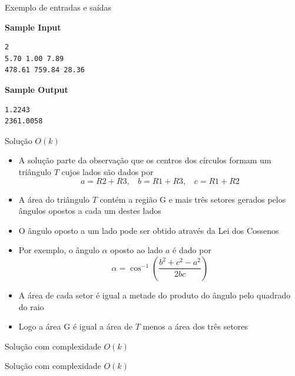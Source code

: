 \begin{frame}[fragile]{Exemplo de entradas e saídas}

\begin{minipage}[t]{0.5\textwidth}
\textbf{Sample Input}
\begin{verbatim}
2
5.70 1.00 7.89
478.61 759.84 28.36
\end{verbatim}
\end{minipage}
\begin{minipage}[t]{0.45\textwidth}
\textbf{Sample Output}
\begin{verbatim}
1.2243
2361.0058
\end{verbatim}
\end{minipage}
\end{frame}

\begin{frame}[fragile]{Solução $O(k)$}

    \begin{itemize}
        \item A solução parte da observação que os centros dos círculos formam um triângulo
            $T$ cujos lados são dados por
        \[
            a = R2 + R3,\ \ \ \ b = R1 + R3,\ \ \ \ c = R1 + R2
        \]

        \item A área do triângulo $T$ contém a região G e mais três setores gerados pelos
            ângulos opostos a cada um destes lados

        \item O ângulo oposto a um lado pode ser obtido através da Lei dos Cossenos

        \item Por exemplo, o ângulo $\alpha$ oposto ao lado $a$ é dado por
        \[
            \alpha = \cos^{-1} \left(\frac{b^2 + c^2 - a^2}{2bc}\right)
        \]

        \item A área de cada setor é igual a metade do produto do ângulo pelo quadrado do
            raio

        \item Logo a área G é igual a área de $T$ menos a área dos três setores

    \end{itemize}

\end{frame}

\begin{frame}[fragile]{Solução com complexidade $O(k)$}
\end{frame}

\begin{frame}[fragile]{Solução com complexidade $O(k)$}
\end{frame}
